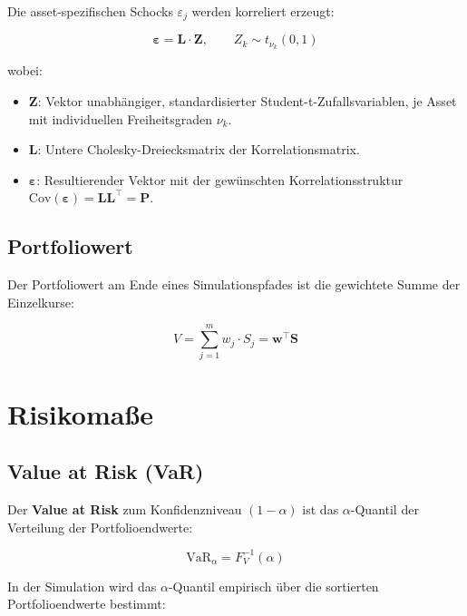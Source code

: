 \documentclass[12pt, a4paper]{article}
\begin{document}
Die asset-spezifischen Schocks $\varepsilon_j$ werden korreliert erzeugt:

\begin{equation}
    \boldsymbol{\varepsilon} = \mathbf{L} \cdot \mathbf{Z},
    \qquad Z_k \sim t_{\nu_k}(0, 1)
\end{equation}

wobei:
\begin{itemize}[leftmargin=1.5em]
    \item $\mathbf{Z}$: Vektor unabhängiger, standardisierter Student-t-Zufallsvariablen,
          je Asset mit individuellen Freiheitsgraden $\nu_k$.
    \item $\mathbf{L}$: Untere Cholesky-Dreiecksmatrix der Korrelationsmatrix.
    \item $\boldsymbol{\varepsilon}$: Resultierender Vektor mit der gewünschten
          Korrelationsstruktur $\text{Cov}(\boldsymbol{\varepsilon}) = \mathbf{L}\mathbf{L}^\top = \mathbf{P}$.
\end{itemize}

\subsection{Portfoliowert}

Der Portfoliowert am Ende eines Simulationspfades ist die gewichtete Summe der
Einzelkurse:

\begin{equation}
    V = \sum_{j=1}^{m} w_j \cdot S_j
    = \mathbf{w}^\top \mathbf{S}
\end{equation}

\section{Risikomaße}

\subsection{Value at Risk (VaR)}

Der \textbf{Value at Risk} zum Konfidenzniveau $(1-\alpha)$ ist das
$\alpha$-Quantil der Verteilung der Portfolioendwerte:

\begin{equation}
    \text{VaR}_\alpha = F_V^{-1}(\alpha)
\end{equation}

In der Simulation wird das $\alpha$-Quantil empirisch über die sortierten
Portfolioendwerte bestimmt:
\end{document}
